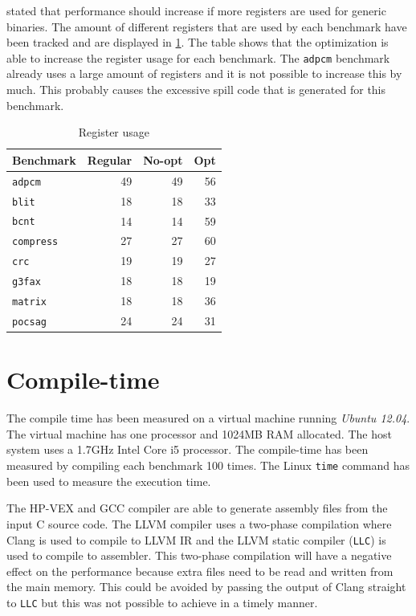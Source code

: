 \cite{Anthony-Brandon:2013jk} stated that performance should increase if more registers are used for generic binaries. The amount of different registers that are used by each benchmark have been tracked and are displayed in \ref{tbl:gen_regs}. The table shows that the optimization is able to increase the register usage for each benchmark. The \texttt{adpcm} benchmark already uses a large amount of registers and it is not possible to increase this by much. This probably causes the excessive spill code that is generated for this benchmark.

\begin{table}
  \centering
    \begin{tabular}{|l|r|r|r|}
    \hline
    \textbf{Benchmark} & \multicolumn{1}{|r|}{\textbf{Regular}} & \multicolumn{1}{|r|}{\textbf{No-opt}} & \multicolumn{1}{|r|}{\textbf{Opt}} \\ \hline
	\texttt{adpcm} 		&   49  &	49 & 	56 \\ \hline
	\texttt{blit} 		&   18  &	18 & 	33 \\ \hline
	\texttt{bcnt} 		&   14  &	14 & 	59 \\ \hline
	\texttt{compress} 	&   27  &	27 & 	60 \\ \hline
	\texttt{crc} 		&   19  &	19 & 	27 \\ \hline
	\texttt{g3fax} 		&   18  &	18 & 	19 \\ \hline
	\texttt{matrix} 	&   18 	&	18 & 	36 \\ \hline
	\texttt{pocsag}		&   24  &	24 & 	31 \\ \hline
    \end{tabular}
  \caption{Register usage}
  \label{tbl:gen_regs}
\end{table}

\section{Compile-time}
The compile time has been measured on a virtual machine running \emph{Ubuntu 12.04}. The virtual machine has one processor and 1024MB RAM allocated. The host system uses a 1.7GHz Intel Core i5 processor. The compile-time has been measured by compiling each benchmark 100 times. The Linux \texttt{time} command has been used to measure the execution time.

The HP-VEX and GCC compiler are able to generate assembly files from the input C source code. The LLVM compiler uses a two-phase compilation where Clang is used to compile to LLVM IR and the LLVM static compiler (\texttt{LLC}) is used to compile to assembler. This two-phase compilation will have a negative effect on the performance because extra files need to be read and written from the main memory. This could be avoided by passing the output of Clang straight to \texttt{LLC} but this was not possible to achieve in a timely manner.

